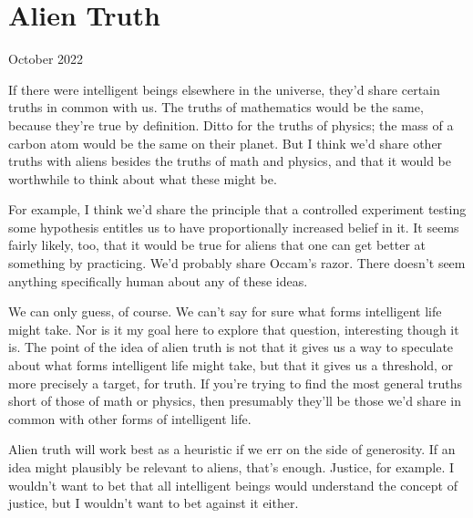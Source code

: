 \chapter{Alien Truth}


            
              
                

October 2022

If there were intelligent beings
                  elsewhere in the universe, they'd share certain truths in
                  common with us. The truths of mathematics would be the same,
                  because they're true by definition. Ditto for the truths of
                  physics; the mass of a carbon atom would be the same on their
                  planet. But I think we'd share other truths with aliens
                  besides the truths of math and physics, and that it would be
                  worthwhile to think about what these might be.

For
                  example, I think we'd share the principle that a controlled
                  experiment testing some hypothesis entitles us to have
                  proportionally increased belief in it. It seems fairly likely,
                  too, that it would be true for aliens that one can get better
                  at something by practicing. We'd probably share Occam's razor.
                  There doesn't seem anything specifically human about any of
                  these ideas.

We can only guess, of course. We can't
                  say for sure what forms intelligent life might take. Nor is it
                  my goal here to explore that question, interesting though it
                  is. The point of the idea of alien truth is not that it gives
                  us a way to speculate about what forms intelligent life might
                  take, but that it gives us a threshold, or more precisely a
                  target, for truth. If you're trying to find the most general
                  truths short of those of math or physics, then presumably
                  they'll be those we'd share in common with other forms of
                  intelligent life.

Alien truth will work best as a
                  heuristic if we err on the side of generosity. If an idea
                  might plausibly be relevant to aliens, that's enough. Justice,
                  for example. I wouldn't want to bet that all intelligent
                  beings would understand the concept of justice, but I wouldn't
                  want to bet against it either.


